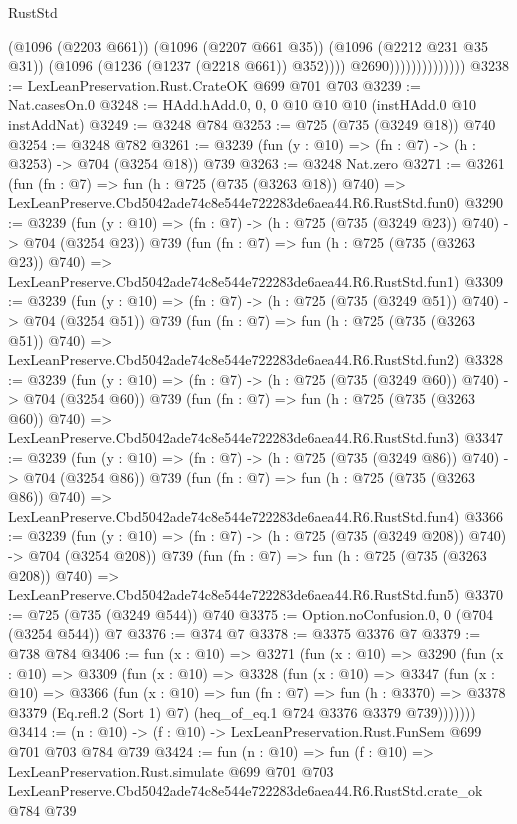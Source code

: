 \begin{lexlean}{RustStd}
\begin{coremodule}
                                    (@1096 (@2203 @661))
                                    (@1096 (@2207 @661 @35))
                                    (@1096 (@2212 @231 @35 @31))
                                    (@1096 (@1236 (@1237 (@2218 @661)) @352))))
                                @2690))))))))))))))
@3238 := LexLeanPreservation.Rust.CrateOK @699 @701 @703
@3239 := Nat.casesOn.{0}
@3248 := HAdd.hAdd.{0, 0, 0} @10 @10 @10 (instHAdd.{0} @10 instAddNat)
@3249 := @3248 @784
@3253 := @725 (@735 (@3249 @18)) @740
@3254 := @3248 @782
@3261 := @3239 (fun (y : @10) => (fn : @7) -> (h : @3253) -> @704 (@3254 @18)) @739
@3263 := @3248 Nat.zero
@3271 := @3261
    (fun (fn : @7) =>
    fun (h : @725 (@735 (@3263 @18)) @740) =>
    LexLeanPreserve.Cbd5042ade74c8e544e722283de6aea44.R6.RustStd.fun0)
@3290 := @3239
    (fun (y : @10) => (fn : @7) -> (h : @725 (@735 (@3249 @23)) @740) -> @704 (@3254 @23))
    @739
    (fun (fn : @7) =>
    fun (h : @725 (@735 (@3263 @23)) @740) =>
    LexLeanPreserve.Cbd5042ade74c8e544e722283de6aea44.R6.RustStd.fun1)
@3309 := @3239
    (fun (y : @10) => (fn : @7) -> (h : @725 (@735 (@3249 @51)) @740) -> @704 (@3254 @51))
    @739
    (fun (fn : @7) =>
    fun (h : @725 (@735 (@3263 @51)) @740) =>
    LexLeanPreserve.Cbd5042ade74c8e544e722283de6aea44.R6.RustStd.fun2)
@3328 := @3239
    (fun (y : @10) => (fn : @7) -> (h : @725 (@735 (@3249 @60)) @740) -> @704 (@3254 @60))
    @739
    (fun (fn : @7) =>
    fun (h : @725 (@735 (@3263 @60)) @740) =>
    LexLeanPreserve.Cbd5042ade74c8e544e722283de6aea44.R6.RustStd.fun3)
@3347 := @3239
    (fun (y : @10) => (fn : @7) -> (h : @725 (@735 (@3249 @86)) @740) -> @704 (@3254 @86))
    @739
    (fun (fn : @7) =>
    fun (h : @725 (@735 (@3263 @86)) @740) =>
    LexLeanPreserve.Cbd5042ade74c8e544e722283de6aea44.R6.RustStd.fun4)
@3366 := @3239
    (fun (y : @10) => (fn : @7) -> (h : @725 (@735 (@3249 @208)) @740) -> @704 (@3254 @208))
    @739
    (fun (fn : @7) =>
    fun (h : @725 (@735 (@3263 @208)) @740) =>
    LexLeanPreserve.Cbd5042ade74c8e544e722283de6aea44.R6.RustStd.fun5)
@3370 := @725 (@735 (@3249 @544)) @740
@3375 := Option.noConfusion.{0, 0} (@704 (@3254 @544)) @7
@3376 := @374 @7
@3378 := @3375 @3376 @7
@3379 := @738 @784
@3406 := fun (x : @10) =>
  @3271
    (fun (x : @10) =>
    @3290
      (fun (x : @10) =>
      @3309
        (fun (x : @10) =>
        @3328
          (fun (x : @10) =>
          @3347
            (fun (x : @10) =>
            @3366
              (fun (x : @10) =>
              fun (fn : @7) =>
              fun (h : @3370) =>
              @3378 @3379 (Eq.refl.{2} (Sort 1) @7) (heq_of_eq.{1} @724 @3376 @3379 @739)))))))
@3414 := (n : @10) -> (f : @10) -> LexLeanPreservation.Rust.FunSem @699 @701 @703 @784 @739
@3424 := fun (n : @10) =>
  fun (f : @10) =>
  LexLeanPreservation.Rust.simulate
    @699
    @701
    @703
    LexLeanPreserve.Cbd5042ade74c8e544e722283de6aea44.R6.RustStd.crate_ok
    @784
    @739
\end{coremodule}
\end{lexlean}
